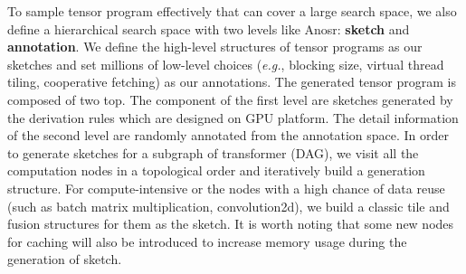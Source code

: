To sample tensor program effectively that can cover a large search space, we also define a hierarchical search
space with two levels like Anosr: \textbf{sketch} and \textbf{annotation}. We define the high-level structures 
of tensor programs as our sketches and set millions of low-level choices (\textit{e.g.}, blocking size, virtual thread tiling, cooperative fetching) as our annotations. The generated tensor program is composed of two top. The component of the first level are sketches generated
by the derivation rules which are designed on GPU platform. The detail information of the second level are randomly annotated from the annotation
space. In order to generate sketches for a subgraph of transformer (DAG), we visit all the computation nodes in a topological order and iteratively build 
a generation structure. For compute-intensive or the nodes with a high chance of data reuse (such as batch matrix multiplication, convolution2d), we build 
a classic tile and fusion structures for them as the sketch. It is worth noting that some new nodes for caching will also be introduced to increase memory 
usage during the generation of sketch.



